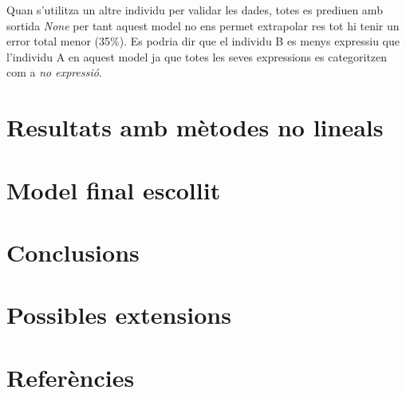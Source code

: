 \documentclass[a4paper]{article}
\begin{document}
Quan s'utilitza un altre individu per validar les dades, totes es prediuen amb sortida \emph{None} per tant aquest model no ens permet extrapolar res tot hi tenir un error total menor (35\%). Es podria dir que el individu B es menys expressiu que l’individu A  en aquest model ja que totes les seves expressions es categoritzen com a \emph{no expressió}.

\section{Resultats amb mètodes no lineals}
\section{Model final escollit}
\section{Conclusions}
\section{Possibles extensions}
\section{Referències}



\end{document}
